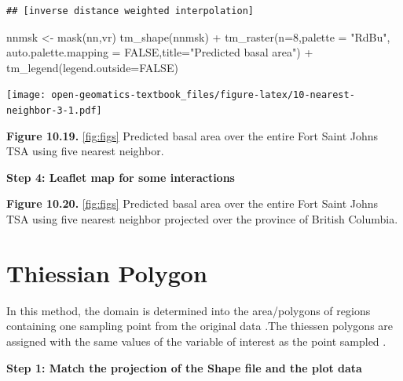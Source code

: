 \documentclass[
]{book}
\newenvironment{Shaded}{\begin{snugshade}}{\end{snugshade}}
\newcommand{\AttributeTok}[1]{\textcolor[rgb]{0.77,0.63,0.00}{#1}}
\newcommand{\ConstantTok}[1]{\textcolor[rgb]{0.00,0.00,0.00}{#1}}
\newcommand{\DecValTok}[1]{\textcolor[rgb]{0.00,0.00,0.81}{#1}}
\newcommand{\FunctionTok}[1]{\textcolor[rgb]{0.00,0.00,0.00}{#1}}
\newcommand{\NormalTok}[1]{#1}
\newcommand{\OtherTok}[1]{\textcolor[rgb]{0.56,0.35,0.01}{#1}}
\newcommand{\SpecialCharTok}[1]{\textcolor[rgb]{0.00,0.00,0.00}{#1}}
\newcommand{\StringTok}[1]{\textcolor[rgb]{0.31,0.60,0.02}{#1}}
\begin{document}
\begin{verbatim}
## [inverse distance weighted interpolation]
\end{verbatim}

\begin{Shaded}
\begin{Highlighting}[]
\NormalTok{nnmsk }\OtherTok{\textless{}{-}} \FunctionTok{mask}\NormalTok{(nn,vr)}
\FunctionTok{tm\_shape}\NormalTok{(nnmsk) }\SpecialCharTok{+}
  \FunctionTok{tm\_raster}\NormalTok{(}\AttributeTok{n=}\DecValTok{8}\NormalTok{,}\AttributeTok{palette =} \StringTok{"RdBu"}\NormalTok{, }\AttributeTok{auto.palette.mapping =} \ConstantTok{FALSE}\NormalTok{,}\AttributeTok{title=}\StringTok{"Predicted basal area"}\NormalTok{) }\SpecialCharTok{+}
  \FunctionTok{tm\_legend}\NormalTok{(}\AttributeTok{legend.outside=}\ConstantTok{FALSE}\NormalTok{)}
\end{Highlighting}
\end{Shaded}

\texttt{[image: open-geomatics-textbook\_files/figure-latex/10-nearest-neighbor-3-1.pdf]}

\textbf{Figure 10.19.} \ref{fig:figs} Predicted basal area over the entire Fort Saint Johns TSA using five nearest neighbor.

\textbf{Step 4: Leaflet map for some interactions}

\textbf{Figure 10.20.} \ref{fig:figs} Predicted basal area over the entire Fort Saint Johns TSA using five nearest neighbor projected over the province of British Columbia.

\hypertarget{thiessian-polygon}{%
\section{Thiessian Polygon}\label{thiessian-polygon}}

In this method, the domain is determined into the area/polygons of regions containing one sampling point from the original data \citep{Coulston}.The thiessen polygons are assigned with the same values of the variable of interest as the point sampled \citep{Yamada2016}.

\textbf{Step 1: Match the projection of the Shape file and the plot data}
\end{document}
